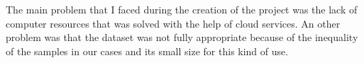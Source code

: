 The main problem that I faced during the creation of the project was the lack of computer resources that was solved with the help of cloud services. An other problem was that the dataset was not fully appropriate because of the inequality of the samples in our cases and its small size for this kind of use.